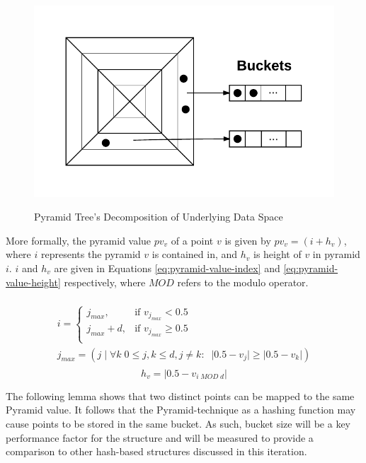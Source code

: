 \begin{figure}
\begin{center}
\begin{subfloat} {%
				\includegraphics[scale=0.5]{figures/pyramid_tree_buckets.pdf}
			}
			\end{subfloat}
		\end{center}

		\caption{Pyramid Tree's Decomposition of Underlying Data Space}
		\label{fig:pyramid-tree-partition}
\end{figure}

More formally, the pyramid value $pv_v$ of a point $v$ is given by $pv_v = (i + h_v)$, where $i$ represents the pyramid $v$ is contained in, and $h_v$ is height of $v$ in pyramid $i$. $i$ and $h_v$ are given in Equations \ref{eq:pyramid-value-index} and \ref{eq:pyramid-value-height} respectively, where $MOD$ refers to the modulo operator.

\begin{multline}\\
	i = \begin{cases}
		j_{max},         & \text{if }v_{j_{max}} < 0.5\\
		j_{max} + d,   & \text{if }v_{j_{max}} \geq 0.5\\
	\end{cases} \\
	j_{max} = \left( j \;|\; \forall k \; 0 \leq j,k \leq d, j \neq k: \;\; \lvert 0.5 - v_j \rvert \geq \lvert 0.5 - v_k \rvert \right) \\
	\label{eq:pyramid-value-index}
\end{multline}
\begin{equation}
	h_v = \lvert 0.5 - v_{i \; MOD \; d} \rvert
	\label{eq:pyramid-value-height}
\end{equation}

The following lemma shows that two distinct points can be mapped to the same Pyramid value. It follows that the Pyramid-technique as a hashing function may cause points to be stored in the same bucket. As such, bucket size will be a key performance factor for the structure and will be measured to provide a comparison to other hash-based structures discussed in this iteration.

